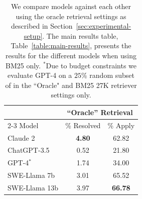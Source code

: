 \begin{table}
\centering
\begin{tabular}{lcc}
\toprule
\multirow{2}{*}{} & \multicolumn{2}{c}{``Oracle'' Retrieval} \\
\cmidrule(lr){2-3} 
Model & \% Resolved & \% Apply  \\
\midrule
Claude 2        & {\bf 4.80} & 62.82  \\
ChatGPT-3.5     & 0.52       & 21.80  \\
GPT-4$^*$       & 1.74       & 34.00  \\
SWE-Llama 7b    & 3.01       & 65.52  \\
SWE-Llama 13b   & 3.97       & {\bf 66.78}  \\
\bottomrule
\end{tabular}
\caption{
We compare models against each other using the oracle retrieval settings as described in Section~\ref{sec:experimental-setup}. The main results table, Table~\ref{table:main-results}, presents the results for the different models when using BM25 only. $^*$Due to budget constraints we evaluate GPT-4 on a $25$\% random subset of \benchmark{} in the ``Oracle" and BM25 27K retriever settings only.
}
\label{table:main-results-oracle}
\end{table}


